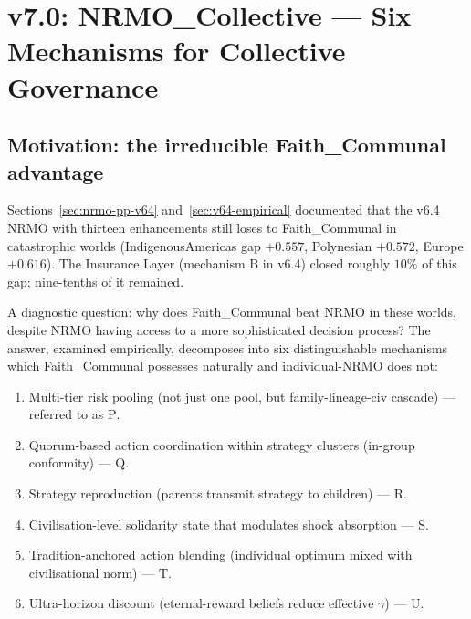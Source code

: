 \section{v7.0: NRMO\_Collective — Six Mechanisms for Collective Governance}
\label{sec:nrmo-collective-v70}


\subsection{Motivation: the irreducible Faith\_Communal advantage}

Sections~\ref{sec:nrmo-pp-v64} and~\ref{sec:v64-empirical} documented
that the v6.4 NRMO with thirteen enhancements still loses to
Faith\_Communal in catastrophic worlds (IndigenousAmericas gap
$+0.557$, Polynesian $+0.572$, Europe $+0.616$). The Insurance Layer
(mechanism B in v6.4) closed roughly $10\%$ of this gap; nine-tenths
of it remained.

A diagnostic question: why does Faith\_Communal beat NRMO in these
worlds, despite NRMO having access to a more sophisticated decision
process? The answer, examined empirically, decomposes into six
distinguishable mechanisms which Faith\_Communal possesses naturally
and individual-NRMO does not:

\begin{enumerate}
\item Multi-tier risk pooling (not just one pool, but family-lineage-civ
  cascade) — referred to as \textsc{P}.
\item Quorum-based action coordination within strategy clusters
  (in-group conformity) — \textsc{Q}.
\item Strategy reproduction (parents transmit strategy to children) —
  \textsc{R}.
\item Civilisation-level solidarity state that modulates shock
  absorption — \textsc{S}.
\item Tradition-anchored action blending (individual optimum mixed
  with civilisational norm) — \textsc{T}.
\item Ultra-horizon discount (eternal-reward beliefs reduce effective
  $\gamma$) — \textsc{U}.
\end{enumerate}

